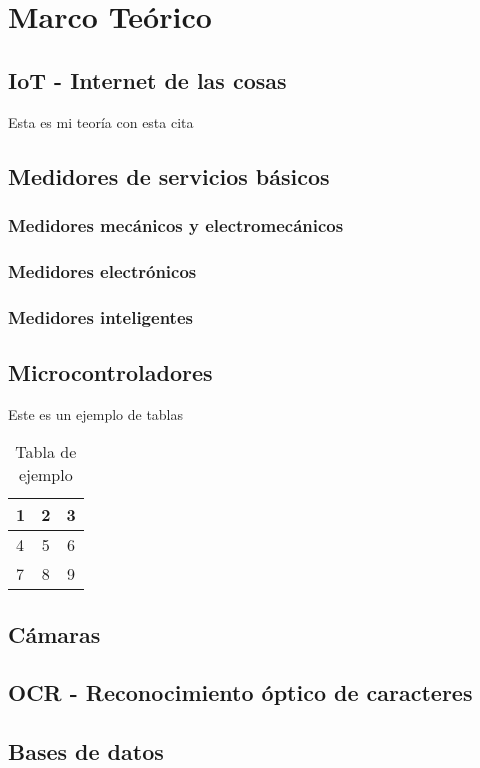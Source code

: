 \chapter{Marco Teórico}
\section{IoT - Internet de las cosas}
    Esta es mi teoría con esta cita \cite{libro:ejemplo_dos_autores}
\section{Medidores de servicios básicos}
    \subsection{Medidores mecánicos y electromecánicos}
    \subsection{Medidores electrónicos}
    \subsection{Medidores inteligentes}
\section{Microcontroladores}
    Este es un ejemplo de tablas
    \begin{table}[ht!]
		\begin{center}
				\begin{tabular}{l c c}
			1 & 2 & 3 \\ \hline
			4 & 5 & 6\\
			7&8&9\\
		\end{tabular}	
		\end{center}

		\caption{Tabla de ejemplo}
	\end{table}
\section{Cámaras}
\section{OCR - Reconocimiento óptico de caracteres}
\section{Bases de datos}